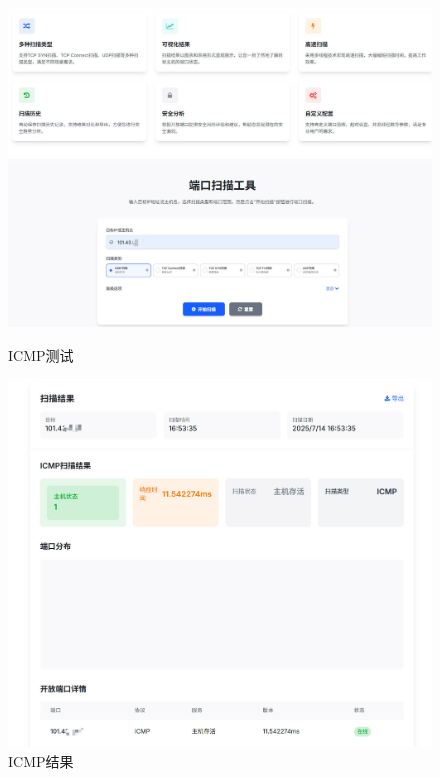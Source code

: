 \documentclass[12pt,hyperref,a4paper,UTF8]{ctexart}
\begin{document}
\begin{figure}[htbp]
    \centering
    \begin{minipage}[t]{0.48\textwidth}
        \centering
        \includegraphics[width=\textwidth]{figures/icmpScan.jpg}
        \caption{ICMP测试}
        \label{fig:icmpScan}
    \end{minipage}
    \hfill
    \begin{minipage}[t]{0.48\textwidth}
        \centering
        \includegraphics[width=\textwidth]{figures/icmpResult.jpg}
        \caption{ICMP结果}
        \label{fig:icmpResult}
    \end{minipage}
\end{figure}
\end{document}

